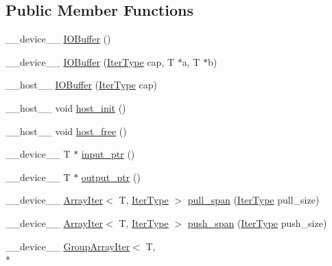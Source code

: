 \subsection*{Public Member Functions}
\begin{DoxyCompactItemize}
\item 
\-\_\-\-\_\-device\-\_\-\-\_\- \hyperlink{structutil_1_1IOBuffer_aa36ca8da10715a25eb089e3ef7f077f0}{I\-O\-Buffer} ()
\item 
\-\_\-\-\_\-device\-\_\-\-\_\- \hyperlink{structutil_1_1IOBuffer_a4bff2569c8da1865b67f91ba269af1a3}{I\-O\-Buffer} (\hyperlink{structutil_1_1IOBuffer_aa942c705a66498986a60878c9fc125c0}{Iter\-Type} cap, T $\ast$a, T $\ast$b)
\item 
\-\_\-\-\_\-host\-\_\-\-\_\- \hyperlink{structutil_1_1IOBuffer_aa17068443182e3300257ba88d026f525}{I\-O\-Buffer} (\hyperlink{structutil_1_1IOBuffer_aa942c705a66498986a60878c9fc125c0}{Iter\-Type} cap)
\item 
\-\_\-\-\_\-host\-\_\-\-\_\- void \hyperlink{structutil_1_1IOBuffer_aba5351cf7791bd43f57f25d6a1461aa7}{host\-\_\-init} ()
\item 
\-\_\-\-\_\-host\-\_\-\-\_\- void \hyperlink{structutil_1_1IOBuffer_a8cda3ee8af366c19f10883478e102b2f}{host\-\_\-free} ()
\item 
\-\_\-\-\_\-device\-\_\-\-\_\- T $\ast$ \hyperlink{structutil_1_1IOBuffer_a59bbca317f3622aac4c9997acf695b50}{input\-\_\-ptr} ()
\item 
\-\_\-\-\_\-device\-\_\-\-\_\- T $\ast$ \hyperlink{structutil_1_1IOBuffer_a50344354a51f9be8db5c9854adbccb2c}{output\-\_\-ptr} ()
\item 
\-\_\-\-\_\-device\-\_\-\-\_\- \hyperlink{structutil_1_1ArrayIter}{Array\-Iter}$<$ T, \hyperlink{structutil_1_1IOBuffer_aa942c705a66498986a60878c9fc125c0}{Iter\-Type} $>$ \hyperlink{structutil_1_1IOBuffer_a4f828cdf86335c332e315af21952395c}{pull\-\_\-span} (\hyperlink{structutil_1_1IOBuffer_aa942c705a66498986a60878c9fc125c0}{Iter\-Type} pull\-\_\-size)
\item 
\-\_\-\-\_\-device\-\_\-\-\_\- \hyperlink{structutil_1_1ArrayIter}{Array\-Iter}$<$ T, \hyperlink{structutil_1_1IOBuffer_aa942c705a66498986a60878c9fc125c0}{Iter\-Type} $>$ \hyperlink{structutil_1_1IOBuffer_a457e10958a6c2adfe3025a771db48a1d}{push\-\_\-span} (\hyperlink{structutil_1_1IOBuffer_aa942c705a66498986a60878c9fc125c0}{Iter\-Type} push\-\_\-size)
\item 
\-\_\-\-\_\-device\-\_\-\-\_\- \hyperlink{structutil_1_1GroupArrayIter}{Group\-Array\-Iter}$<$ T, \\*

\end{DoxyCompactItemize}
